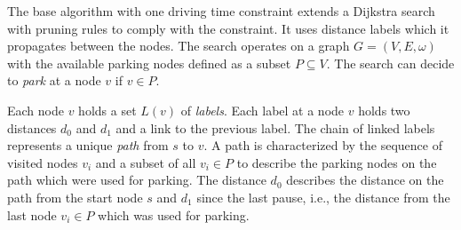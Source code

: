 The base algorithm with one driving time constraint extends a Dijkstra search with pruning rules to comply with the constraint. It uses distance labels which it propagates between the nodes. The search operates on a graph $G = (V,E,\omega)$ with the available parking nodes defined as a subset $P \subseteq V$. The search can decide to \emph{park} at a node $v$ if $v \in P$.

Each node $v$ holds a set $L(v)$ of \emph{labels}. Each label at a node $v$ holds two distances $d_0$ and $d_1$ and a link to the previous label. The chain of linked labels represents a unique \emph{path} from $s$ to $v$. A path is characterized by the sequence of visited nodes $v_i$ and a subset of all $v_i \in P$ to describe the parking nodes on the path which were used for parking. The distance $d_0$ describes the distance on the path from the start node $s$ and $d_1$ since the last pause, i.e., the distance from the last node $v_i \in P$ which was used for parking.


